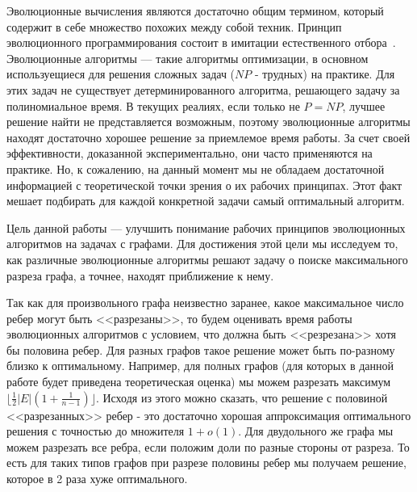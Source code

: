 \documentclass[times]{itmo-student-thesis}
\begin{document}

\tableofcontents

\startprefacepage
Эволюционные вычисления являются достаточно общим термином, который содержит в себе множество похожих между собой техник.
Принцип эволюционного программирования состоит в имитации естественного отбора~\cite{Skobtsov08}.
Эволюционные алгоритмы --- такие алгоритмы оптимизации, в основном используещиеся для решения сложных задач ($NP$ - трудных) на практике.
Для этих задач не существует детерминированного алгоритма, решающего задачу за полиномиальное время.
В текущих реалиях, если только не $P = NP$, лучшее решение найти не представляется возможным, поэтому эволюционные алгоритмы находят достаточно хорошее решение за приемлемое время работы.
За счет своей эффективности, доказанной экспериментально, они часто применяются на практике.
Но, к сожалению, на данный момент мы не обладаем достаточной информацией с теоретической точки зрения о их рабочих принципах.
Этот факт мешает подбирать для каждой конкретной задачи самый оптимальный алгоритм.

Цель данной работы --- улучшить понимание рабочих принципов эволюционных алгоритмов на задачах с графами.
Для достижения этой цели мы исследуем то, как различные эволюционные алгоритмы решают задачу о поиске максимального разреза графа, а точнее, находят приближение к нему.

Так как для произвольного графа неизвестно заранее, какое максимальное число ребер могут быть <<разрезаны>>, то будем оценивать время работы эволюционных алгоритмов с условием, что должна быть <<резрезана>> хотя бы половина ребер.
Для разных графов такое решение может быть по-разному близко к оптимальному.
Например, для полных графов (для которых в данной работе будет приведена теоретическая оценка) мы можем разрезать максимум $\lfloor\frac{1}{2} |E| (1 + \frac{1}{n-1})\rfloor$.
Исходя из этого можно сказать, что решение с половиной <<разрезанных>> ребер - это достаточно хорошая аппроксимация оптимального решения с точностью до множителя $1 + o(1)$.
Для двудольного же графа мы можем разрезать все ребра, если положим доли по разные стороны от разреза.
То есть для таких типов графов при разрезе половины ребер мы получаем решение, которое в 2 раза хуже оптимального.
\end{document}
